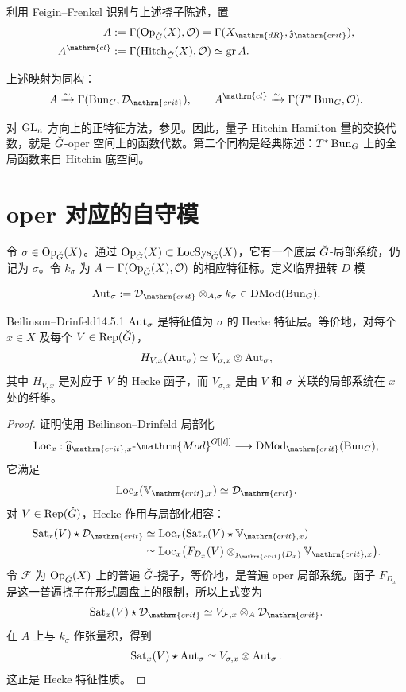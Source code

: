 利用 Feigin–Frenkel 识别与上述挠子陈述，置
\[\begin{aligned}
A&:=\Gamma(\Op_{\checkG}(X),\cO)=\Gamma(X_{\mathrm{dR}},\mathfrak z_{\mathrm{crit}}),\\
A^{\mathrm{cl}}&:=\Gamma(\operatorname{Hitch}_{\checkG}(X),\cO)\simeq\operatorname{gr}A.
\end{aligned}\]
\begin{theorem*}{}
上述映射为同构\cite{BD91}：
\[A\xrightarrow{\sim}\Gamma(\Bun_G,\cD_{\mathrm{crit}}),\qquad
A^{\mathrm{cl}}\xrightarrow{\sim}\Gamma(T^*\Bun_G,\cO).\]
\end{theorem*}
对 $\operatorname{GL}_n$ 方向上的正特征方法，参见\cite{BCTZ16}。因此，量子 Hitchin Hamilton 量的交换代数，就是 $\check{G}$-oper 空间上的函数代数。第二个同构是经典陈述：$T^*\operatorname{Bun}_G$ 上的全局函数来自 Hitchin 底空间。

\section{oper 对应的自守模}\label{sec:14.5}
令 $\sigma\in\operatorname{Op}_{\check{G}}(X)$。通过 $\operatorname{Op}_{\check{G}}(X)\subset\operatorname{LocSys}_{\check{G}}(X)$，它有一个底层 $\check{G}$-局部系统，仍记为 $\sigma$。令 $k_\sigma$ 为 $A=\Gamma(\operatorname{Op}_{\check{G}}(X),\mathcal{O})$ 的相应特征标。定义临界扭转 $D$ 模
\begin{definition*}{}
\[\Aut_\sigma:=\cD_{\mathrm{crit}}\otimes_{A,\sigma}k_\sigma\in\DMod(\Bun_G).\]
\end{definition*}
\begin{theorem}{Beilinson–Drinfeld\cite{BD91}}{14.5.1}
$\operatorname{Aut}_\sigma$ 是特征值为 $\sigma$ 的 Hecke 特征层。等价地，对每个 $x\in X$ 及每个 $V\in\operatorname{Rep}(\check{G})$，
\[H_{V,x}(\operatorname{Aut}_\sigma)\simeq V_{\sigma,x}\otimes\operatorname{Aut}_\sigma,\]
其中 $H_{V,x}$ 是对应于 $V$ 的 Hecke 函子，而 $V_{\sigma,x}$ 是由 $V$ 和 $\sigma$ 关联的局部系统在 $x$ 处的纤维。
\end{theorem}
\begin{proof}

证明使用 Beilinson–Drinfeld 局部化
\[\operatorname{Loc}_x:\widehat{\mathfrak g}_{\mathrm{crit},x}\text{-}\mathrm{Mod}^{G[[t]]}\longrightarrow\DMod_{\mathrm{crit}}(\Bun_G),\]
它满足
\[\operatorname{Loc}_x(\mathbb V_{\mathrm{crit},x})\simeq\cD_{\mathrm{crit}}.\]
对 $V\in\operatorname{Rep}(\check{G})$，Hecke 作用与局部化相容：
\[\begin{aligned}
\operatorname{Sat}_x(V)\star\cD_{\mathrm{crit}}
&\simeq\operatorname{Loc}_x(\operatorname{Sat}_x(V)\star\mathbb V_{\mathrm{crit},x})\\
&\simeq\operatorname{Loc}_x\bigl(F_{D_x}(V)\otimes_{\mathfrak z_{\mathrm{crit}}(D_x)}\mathbb V_{\mathrm{crit},x}\bigr).
\end{aligned}\]
令 $\mathcal F$ 为 $\operatorname{Op}_{\check{G}}(X)$ 上的普遍 $\check{G}$-挠子，等价地，是普遍 oper 局部系统。函子 $F_{D_x}$ 是这一普遍挠子在形式圆盘上的限制，所以上式变为
\[\operatorname{Sat}_x(V)\star\cD_{\mathrm{crit}}\simeq V_{\mathcal F,x}\otimes_A\cD_{\mathrm{crit}}.\]
在 $A$ 上与 $k_\sigma$ 作张量积，得到
\[\operatorname{Sat}_x(V)\star\operatorname{Aut}_\sigma\simeq V_{\sigma,x}\otimes\operatorname{Aut}_\sigma.\]
这正是 Hecke 特征性质。
\end{proof}

